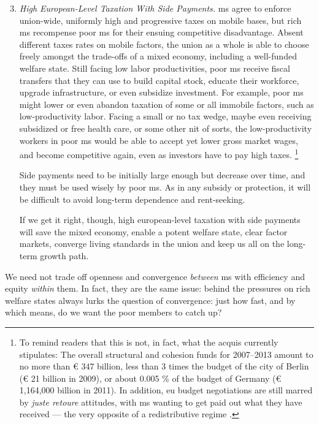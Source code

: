 \begin{enumerate}
	\setcounter{enumi}{2}
	\item \emph{High European-Level Taxation With Side Payments.}
	\gls{ms} agree to enforce union-wide, uniformly high and progressive taxes on mobile bases, but rich \gls{ms} recompense poor \gls{ms} for their ensuing competitive disadvantage.
	Absent different taxes rates on mobile factors, the union as a whole is able to choose freely amongst the trade-offs of a mixed economy, including a well-funded welfare state.
	Still facing low labor productivities, poor \gls{ms} receive fiscal transfers that they can use to build capital stock, educate their workforce, upgrade infrastructure, or even subsidize investment.
	For example, poor \gls{ms} might lower or even abandon taxation of some or all immobile factors, such as low-productivity labor.
	Facing a small or no tax wedge, maybe even receiving subsidized or free health care, or some other \gls{nit} of sorts, the low-productivity workers in poor \gls{ms} would be able to accept yet lower gross market wages, and become competitive again, even as investors have to pay high taxes.
	\footnote{
		To remind readers that this is not, in fact, what the acquis currently stipulates:
		The overall structural and cohesion funds for 2007--2013 amount to no more than \euro{} 347 billion, less than 3 times the budget of the city of Berlin (\euro{} 21 billion in 2009), or about 0.005 \% of the budget of Germany (\euro{} 1,164,000 billion in 2011).
		In addition, \gls{eu} budget negotiations are still marred by \emph{juste retoure} attitudes, with \gls{ms} wanting to get paid out what they have received --- the very opposite of a redistributive regime \cite[for example,][]{Begg2008a}.
	}

	Side payments need to be initially large enough but decrease over time, and they must be used wisely by poor \gls{ms}.
	As in any subsidy or  protection, it will be difficult to avoid long-term dependence and rent-seeking.

	If we get it right, though, high european-level taxation with side payments will save the mixed economy, enable a potent welfare state, clear factor markets, converge living standards in the union and keep us all on the long-term growth path.
\end{enumerate}


We need not trade off openness and convergence \emph{between} \gls{ms} with efficiency and equity \emph{within} them.
In fact, they are the same issue:
behind the pressures on rich welfare states always lurks the question of convergence:
just how fast, and by which means, do we want the poor members to catch up?

